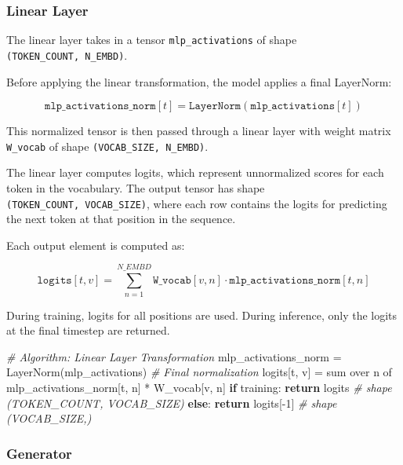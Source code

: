 \documentclass[11pt]{article}
\newenvironment{Shaded}{}{}
\newcommand{\DecValTok}[1]{\textcolor[rgb]{0.25,0.63,0.44}{{#1}}}
\newcommand{\CommentTok}[1]{\textcolor[rgb]{0.38,0.63,0.69}{\textit{{#1}}}}
\newcommand{\NormalTok}[1]{{#1}}
\newcommand{\ControlFlowTok}[1]{\textcolor[rgb]{0.00,0.44,0.13}{\textbf{{#1}}}}
\newcommand{\OperatorTok}[1]{\textcolor[rgb]{0.40,0.40,0.40}{{#1}}}
\newcommand{\BuiltInTok}[1]{{#1}}
\begin{document}
    \subsubsection{Linear Layer}\label{linear-layer}

The linear layer takes in a tensor \texttt{mlp\_activations} of shape
\texttt{(TOKEN\_COUNT,\ N\_EMBD)}.

Before applying the linear transformation, the model applies a final
LayerNorm:

\[
\texttt{mlp\_activations\_norm}[t] = \texttt{LayerNorm}(\texttt{mlp\_activations}[t])
\]

This normalized tensor is then passed through a linear layer with weight
matrix \texttt{W\_vocab} of shape \texttt{(VOCAB\_SIZE,\ N\_EMBD)}.

The linear layer computes logits, which represent unnormalized scores
for each token in the vocabulary. The output tensor has shape
\texttt{(TOKEN\_COUNT,\ VOCAB\_SIZE)}, where each row contains the
logits for predicting the next token at that position in the sequence.

Each output element is computed as:

\[
\texttt{logits}[t, v] = \sum_{n=1}^{N\_EMBD} \texttt{W\_vocab}[v, n] \cdot \texttt{mlp\_activations\_norm}[t, n]
\]

During training, logits for all positions are used. During inference,
only the logits at the final timestep are returned.

\begin{Shaded}
\begin{Highlighting}[]
\CommentTok{\# Algorithm: Linear Layer Transformation}
\NormalTok{mlp\_activations\_norm }\OperatorTok{=}\NormalTok{ LayerNorm(mlp\_activations)     }\CommentTok{\# Final normalization}
\NormalTok{logits[t, v] }\OperatorTok{=} \BuiltInTok{sum}\NormalTok{ over n of mlp\_activations\_norm[t, n] }\OperatorTok{*}\NormalTok{ W\_vocab[v, n]}
\ControlFlowTok{if}\NormalTok{ training:}
    \ControlFlowTok{return}\NormalTok{ logits                                     }\CommentTok{\# shape (TOKEN\_COUNT, VOCAB\_SIZE)}
\ControlFlowTok{else}\NormalTok{:}
    \ControlFlowTok{return}\NormalTok{ logits[}\OperatorTok{{-}}\DecValTok{1}\NormalTok{]                                 }\CommentTok{\# shape (VOCAB\_SIZE,)}
\end{Highlighting}
\end{Shaded}

    \subsubsection{Generator}\label{generator}
\end{document}
